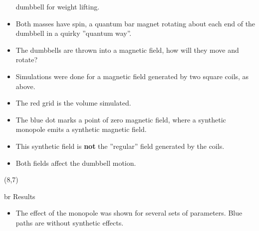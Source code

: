 \documentclass[20pt]{beamer}
\begin{document}
\begin{frame}{}
\begin{textblock}{7.25}
\begin{itemize}[label=\textbullet, leftmargin=25mm]
                   dumbbell for weight lifting.
           \item Both masses have spin, a quantum bar magnet rotating about each end of
                   the dumbbell in a quirky ''quantum way''.
           \item The dumbbells are thrown into a magnetic field, how will they move and
                   rotate?
           \item Simulations were done for a magnetic field generated by two square coils,
                   as above.
           \item The red grid is the volume simulated.
           \item The blue dot marks a point of zero magnetic field, where a synthetic
                   monopole emits a synthetic magnetic
                   field.
           \item This synthetic field is \textbf{not} the ''regular'' field generated by
                   the coils.
           \item Both fields affect the dumbbell motion.
   \end{itemize}

  \end{textblock}
%
%
  \begin{textblock}{7.25}(8,7) 
   \begin{beamercolorbox}[wd=\textwidth, sep=5mm, left, rounded=true, shadow=true]{br}
   Results
   \end{beamercolorbox}
   \begin{itemize}[label=\textbullet, leftmargin=25mm]
           \item The effect of the monopole was shown for several sets of parameters. Blue
                   paths are without synthetic effects.
   \end{itemize}


\end{textblock}
\end{frame}
\end{document}
